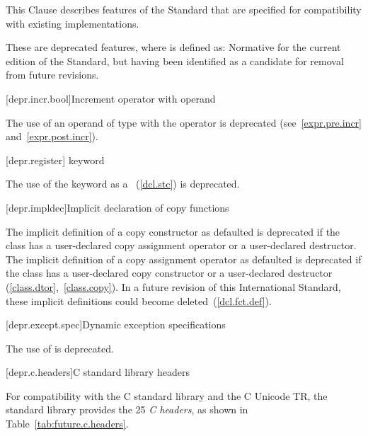 
\pnum
This Clause describes features of the \Cpp Standard that are specified for compatibility with
existing implementations.

\pnum
These are deprecated features, where
is defined as:
Normative for the current edition of the Standard,
but having been identified as a candidate for removal from future revisions.

[depr.incr.bool]{Increment operator with  operand}

\pnum
The use of an operand of type
with the
\tcode{++}
operator is deprecated (see~\ref{expr.pre.incr} and~\ref{expr.post.incr}).

[depr.register]{ keyword}

\pnum
The use of the  keyword as a
~(\ref{dcl.stc}) is deprecated.

[depr.impldec]{Implicit declaration of copy functions}

\pnum
The implicit definition of a copy constructor
as defaulted
is deprecated if the class has a
user-declared copy assignment operator or a user-declared destructor. The implicit
definition of a copy assignment operator
as defaulted is deprecated if the class has a user-declared
copy constructor or a user-declared destructor (\ref{class.dtor},~\ref{class.copy}).
In a future revision of this International Standard, these implicit definitions
could become deleted~(\ref{dcl.fct.def}).

[depr.except.spec]{Dynamic exception specifications}

\pnum
The use of  is deprecated.

[depr.c.headers]{C standard library headers}

\pnum
For compatibility with the
%
C standard library
and the C Unicode TR,
the \Cpp standard library provides the 25
\textit{C headers},
as shown in Table~\ref{tab:future.c.headers}.

